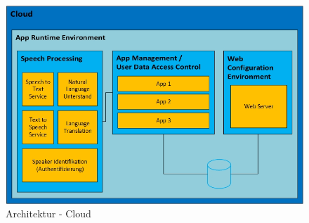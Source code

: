 \begin{figure}[h!]
	\centering
	\includegraphics[width=0.9\linewidth]{Picture/Infrastruktur-Cloud.jpg}
	\caption[Architektur - mobile App]{Architektur - Cloud}
	\label{fig:infrastruktur-cloud}
\end{figure}

